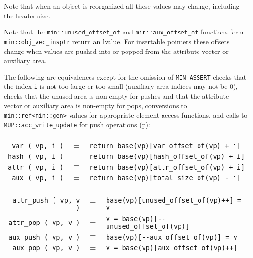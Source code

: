 \documentclass[12pt]{article}
\newcommand{\pagref}[1]{p\pageref{#1}}
\newcommand{\EOL}{\penalty \exhyphenpenalty}
\newenvironment{indpar}[1][0.3in]%
	{\begin{list}{}%
		     {\setlength{\itemsep}{0in}%
		      \setlength{\topsep}{0in}%
		      \setlength{\parsep}{1ex}%
		      \setlength{\labelwidth}{#1}%
		      \setlength{\leftmargin}{#1}%
		      \addtolength{\leftmargin}{\labelsep}}%
	 \item}%
	{\end{list}}
\begin{document}
Note that when an object is reorganized all these values may
change, including the header size.

Note that the {\tt min::\EOL unused\_\EOL offset\_\EOL of} and
{\tt min::\EOL aux\_\EOL offset\_\EOL of} functions for a
{\tt min::\EOL obj\_\EOL vec\_\EOL insptr} return an
lvalue.  For insertable pointers these offsets change when
values are pushed into or popped from the attribute vector or
auxiliary area.

The following are equivalences except for
the omission of {\tt MIN\_\EOL ASSERT} checks that the index \verb|i|
is not too large or too small (auxiliary area indices may not be 0),
checks that the unused area
is non-empty for pushes and that the attribute vector or auxiliary area
is non-empty for pops, conversions to \verb|min::ref<min::gen>|
values for appropriate element access functions, and
calls to {\tt MUP::\EOL acc\_\EOL write\_\EOL update}
for push operations
(\pagref{MUP::ACC_WRITE_GEN_UPDATE}):

\begin{indpar}\begin{tabular}{rcl}
\hspace*{2.0in} \\[-3ex]
\verb|var ( vp, i )| & $\equiv$
    & \verb|return base(vp)[var_offset_of(vp) + i]| \\
\verb|hash ( vp, i )| & $\equiv$
    & \verb|return base(vp)[hash_offset_of(vp) + i]| \\
\verb|attr ( vp, i )| & $\equiv$
    & \verb|return base(vp)[attr_offset_of(vp) + i]| \\
\verb|aux ( vp, i )| & $\equiv$
    & \verb|return base(vp)[total_size_of(vp) - i]| \\
\end{tabular}\end{indpar}\label{OBJECT-VECTOR-EQUIVALENTS}
\begin{indpar}\begin{tabular}{rcl}
\hspace*{2.0in} \\[-3ex]
\verb|attr_push ( vp, v )| & $\equiv$
    & \verb|base(vp)[unused_offset_of(vp)++] = v| \\
\verb|attr_pop ( vp, v )| & $\equiv$
    & \verb|v = base(vp)[--unused_offset_of(vp)]| \\
\verb|aux_push ( vp, v )| & $\equiv$
    & \verb|base(vp)[--aux_offset_of(vp)] = v| \\
\verb|aux_pop ( vp, v )| & $\equiv$
    & \verb|v = base(vp)[aux_offset_of(vp)++]| \\
\end{tabular}\end{indpar}
\end{document}
